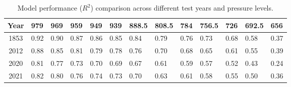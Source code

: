 \documentclass{article}
\begin{document}
    \begin{table}[htbp]
        \centering
        \caption{Model performance ($R^2$) comparison across different test years and pressure levels.}
        \label{tab:model_comparison}
        \begin{tabularx}{\textwidth}{c|*{12}{X}}
            \hline
            \textbf{Year} & \textbf{979} & \textbf{969} & \textbf{959} & \textbf{949} & \textbf{939} & \textbf{888.5} & \textbf{808.5} & \textbf{784} & \textbf{756.5} & \textbf{726} & \textbf{692.5} & \textbf{656} \\ 
            \hline
            1853 & 0.92 & 0.90 & 0.87 & 0.86 & 0.85 & 0.84 & 0.79 & 0.76 & 0.73 & 0.68 & 0.58 & 0.37 \\
            2012 & 0.88 & 0.85 & 0.81 & 0.79 & 0.78 & 0.76 & 0.70 & 0.68 & 0.65 & 0.61 & 0.55 & 0.39 \\
            2020 & 0.81 & 0.77 & 0.73 & 0.70 & 0.69 & 0.67 & 0.61 & 0.59 & 0.57 & 0.52 & 0.43 & 0.24 \\
            2021 & 0.82 & 0.80 & 0.76 & 0.74 & 0.73 & 0.70 & 0.63 & 0.61 & 0.58 & 0.55 & 0.50 & 0.36 \\ 
            \hline
        \end{tabularx}
    \end{table}
\end{document}
